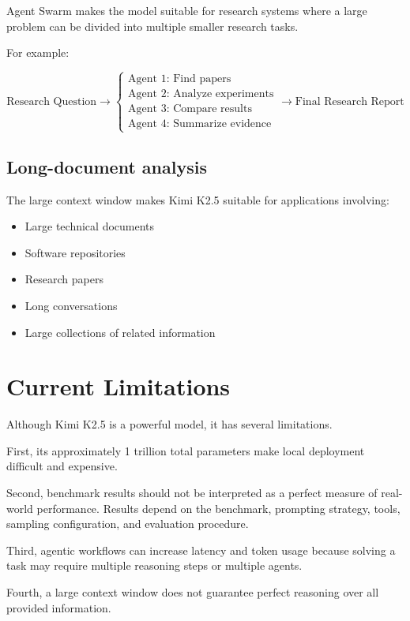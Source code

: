 \documentclass{article}
\begin{document}
Agent Swarm makes the model suitable for research systems where a large problem can be divided into multiple smaller research tasks.

For example:

\[
\text{Research Question}
\rightarrow
\begin{cases}
\text{Agent 1: Find papers}\\
\text{Agent 2: Analyze experiments}\\
\text{Agent 3: Compare results}\\
\text{Agent 4: Summarize evidence}
\end{cases}
\rightarrow
\text{Final Research Report}
\]

\subsection{Long-document analysis}

The large context window makes Kimi K2.5 suitable for applications involving:

\begin{itemize}
\item Large technical documents
\item Software repositories
\item Research papers
\item Long conversations
\item Large collections of related information
\end{itemize}

\section{Current Limitations}

Although Kimi K2.5 is a powerful model, it has several limitations.

First, its approximately 1 trillion total parameters make local deployment difficult and expensive.

Second, benchmark results should not be interpreted as a perfect measure of real-world performance. Results depend on the benchmark, prompting strategy, tools, sampling configuration, and evaluation procedure.

Third, agentic workflows can increase latency and token usage because solving a task may require multiple reasoning steps or multiple agents.

Fourth, a large context window does not guarantee perfect reasoning over all provided information.
\end{document}
